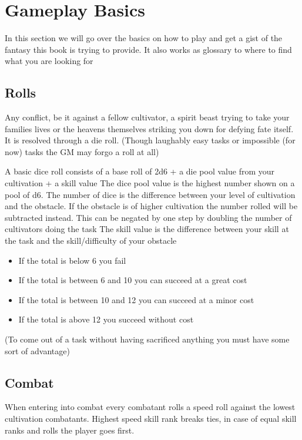 \section{Gameplay Basics}

In this section we will go over the basics on how to play and get a gist of the fantasy this book is trying to provide. It also works as glossary to where to find what you are looking for
\subsection{Rolls}

Any conflict, be it against a fellow cultivator, a spirit beast trying to take your families lives or the heavens themselves striking you down for defying fate itself. It is resolved through a die roll. (Though laughably easy tasks or impossible (for now) tasks the GM may forgo a roll at all)

A basic dice roll consists of a base roll of 2d6 + a die pool value from your cultivation + a skill value
The dice pool value is the highest number shown on a pool of d6. The number of dice is the difference between your level of cultivation and the obstacle. If the obstacle is of higher cultivation the number rolled will be subtracted instead. This can be negated by one step by doubling the number of cultivators doing the task
The skill value is the difference between your skill at the task and the skill/difficulty of your obstacle

\begin{itemize}
    \item If the total is below 6 you fail
    \item If the total is between 6 and 10 you can succeed at a great cost
    \item If the total is between 10 and 12 you can succeed at a minor cost
    \item If the total is above 12 you succeed without cost
\end{itemize}


(To come out of a task without having sacrificed anything you must have some sort of advantage)

\subsection{Combat}

When entering into combat every combatant rolls a speed roll against the lowest cultivation
combatants. Highest speed skill rank breaks ties, in case of equal skill ranks and rolls the player goes first.

